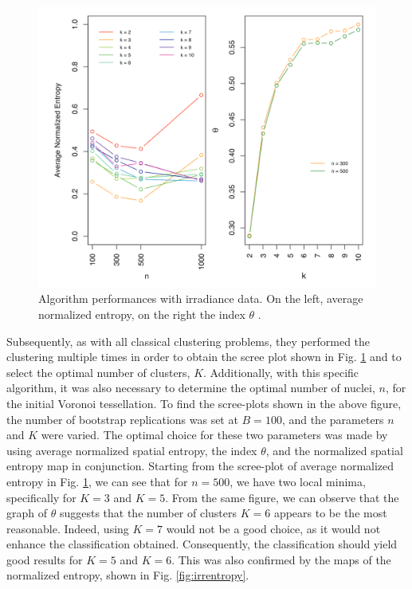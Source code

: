 \begin{figure}
    \centering
    \includegraphics[scale=0.5]{Images/baggingscreeplot.png}
    \caption[Result on irradiance data.]{Algorithm performances with irradiance data. On the left, average normalized entropy, on the right the index $\theta$ \cite{secchi_bagging_2013}.}
    \label{fig:baggingscreeplot}
\end{figure}
Subsequently, as with all classical clustering problems, they performed the clustering multiple times in order to obtain the scree plot shown in Fig. \ref{fig:baggingscreeplot} and to select the optimal number of clusters, $K$. Additionally, with this specific algorithm, it was also necessary to determine the optimal number of nuclei, $n$, for the initial Voronoi tessellation. To find the scree-plots shown in the above figure, the number of bootstrap replications was set at $B=100$, and the parameters $n$ and $K$ were varied. The optimal choice for these two parameters was made by using average normalized spatial entropy, the index $\theta$, and the normalized spatial entropy map in conjunction. Starting from the scree-plot of average normalized entropy in Fig. \ref{fig:baggingscreeplot}, we can see that for $n=500$, we have two local minima, specifically for $K=3$ and $K=5$. From the same figure, we can observe that the graph of $\theta$ suggests that the number of clusters $K=6$ appears to be the most reasonable. Indeed, using $K=7$ would not be a good choice, as it would not enhance the classification obtained. Consequently, the classification should yield good results for $K=5$ and $K=6$. This was also confirmed by the maps of the normalized entropy, shown in Fig. \ref{fig:irrentropy}.
